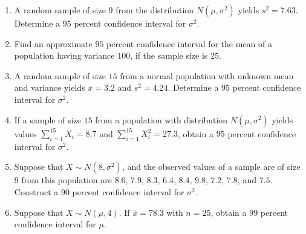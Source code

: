 \documentclass[svgnames]{amsart}
\begin{document}
\begin{enumerate}[leftmargin=*, itemsep=2mm]
\item A random sample of size $9$ from the distribution $N(\mu, \sigma^2)$ yields $s^2 = 7.63$. Determine a $95$ percent confidence interval for $\sigma^2$.

\item Find an approximate $95$ percent confidence interval for the mean of a population having variance $100$, if the sample size is $25$.

\item A random sample of size $15$ from a normal population with unknown mean and variance yields $\overline x = 3.2$ and $s^2 = 4.24$. Determine a $95$ percent confidence interval for $\sigma^2$.

\item If a sample of size $15$ from a population with distribution $N(\mu, \sigma^2)$ yields values $\sum_{i=1}^{15} X_i = 8.7$ and $\sum_{i = 1}^{15} X_i^2 = 27.3$, obtain a $95$ percent confidence interval for $\sigma^2$.

\item Suppose that $X \sim N(8, \sigma^2)$, and the observed values of a sample are of size $9$ from this population are $8.6$, $7.9$, $8.3$, $6.4$, $8.4$, $9.8$, $7.2$, $7.8$, and $7.5$. Construct a $90$ percent confidence interval for $\sigma^2$.

\item Suppose that $X \sim N(\mu, 4)$. If $\overline x = 78.3$ with $n = 25$, obtain a $99$ percent confidence interval for $\mu$.

\end{enumerate}
\end{document}
